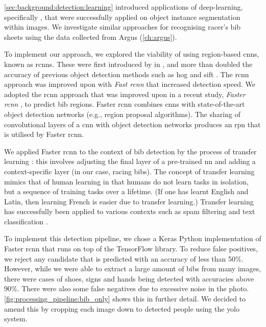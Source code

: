\def \frcnn {Faster \gls{rcnn}}

\cref{sec:background:detection:learning} introduced applications of deep-learning, specifically , that were successfully applied on object instance segmentation within images. We investigate similar approaches for recognising racer's bib sheets using the data collected from Argus  (\cref{ch:argus}).

To implement our approach, we explored the viability of using region-based \glspl{cnn}, known as \glspl{rcnn}. These were first introduced by \citet{Girshick:2014jx} in \citeyear{Girshick:2014jx}, and more than doubled the accuracy of previous object detection methods such as \gls{hog} \citep{Dalal:2005jq} and \gls{sift} \citep{Lowe:2004kp}. The \gls{rcnn} approach was improved upon with \textit{Fast \gls{rcnn}} \citep{Girshick:2015vr} that increased detection speed. We adopted the \gls{rcnn} approach that was improved upon in a  recent \citeyear{Ren:2017ug} study, \textit{\frcnn{}} \citep{Ren:2017ug}, to predict bib regions. \frcnn{} combines \glspl{cnn} with state-of-the-art object detection networks (e.g., region proposal algorithms). The sharing of convolutional layers of a \gls{cnn} with object detection networks produces an \gls{rpn} that is utilised by \frcnn{}.

We applied \frcnn{} to the context of bib detection by the process of transfer learning \cite{Caruana:1997wk,Thrun:1996wh,Baxter:1997wr}: this involves adjusting the final layer of a pre-trained \gls{nn} and adding a context-specific layer (in our case, racing bibs). The concept of transfer learning mimics that of human learning in that humans do not learn tasks in isolation, but a sequence of training tasks over a lifetime. (If one has learnt English and Latin, then learning French is easier due to transfer learning.) Transfer learning has successfully been applied to various contexts such as spam filtering \citep{Bickel:2006ul} and text classification \citep{Raina:2006tv, Do:2005uz}.

To implement this detection pipeline, we chose a Keras \citep{chollet2015keras} Python implementation of \frcnn{} that runs on top of the TensorFlow \citep{tensorflow2015-whitepaper} library. To reduce false positives, we reject any candidate that is predicted with an accuracy of less than 50\%. However, while we were able to extract a large amount of bibs from many images, there were cases of shoes, signs and hands being detected with accuracies above 90\%. There were also some false negatives due to excessive noise in the photo. \cref{fig:processing_pipeline:bib_only} shows this in further detail. We decided to amend this by cropping each image down to detected people using the \gls{yolo} system.


